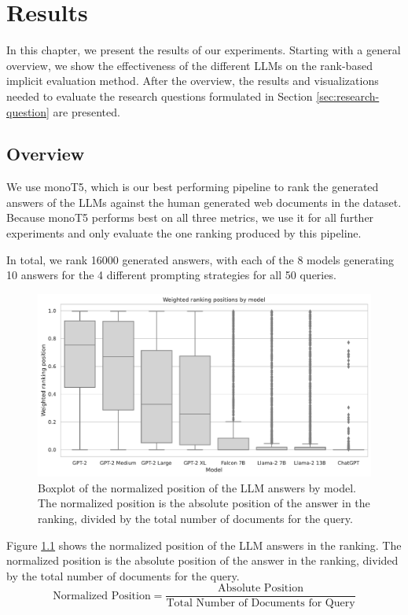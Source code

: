 \chapter{Results}\label{chapter:results}
In this chapter, we present the results of our experiments.
Starting with a general overview, we show the effectiveness of the different LLMs on the rank-based implicit evaluation method.
After the overview, the results and visualizations needed to evaluate the research questions formulated in Section \ref{sec:research-question} are presented.

\section{Overview}
We use monoT5, which is our best performing pipeline to rank the generated answers of the LLMs against the human generated web documents in the dataset.
Because monoT5 performs best on all three metrics, we use it for all further experiments and only evaluate the one ranking produced by this pipeline.

In total, we rank 16000 generated answers, with each of the 8 models generating 10 answers for the 4 different prompting strategies for all 50 queries.
\begin{figure}[tb]
\centering
\includegraphics[width=\textwidth]{images/weighted_position_boxplot.pdf}
\caption{Boxplot of the normalized position of the LLM answers by model. The normalized position is the absolute position of the answer in the ranking, divided by the total number of documents for the query.}
\label{fig:weighted_position_boxplot}
\end{figure}
Figure \ref{fig:weighted_position_boxplot} shows the normalized position of the LLM answers in the ranking.
The normalized position is the absolute position of the answer in the ranking, divided by the total number of documents for the query.
\begin{equation}
    \text{Normalized Position} = \frac{\text{Absolute Position}}{\text{Total Number of Documents for Query}}
\end{equation}

